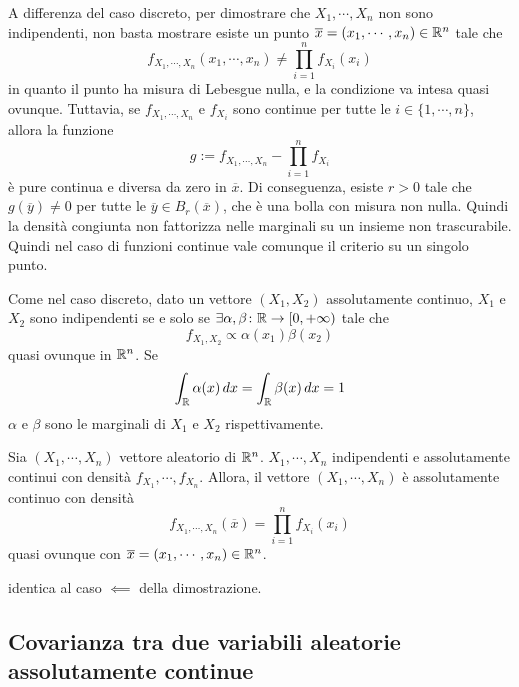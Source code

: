 \documentclass[a4paper]{article}
\begin{document}
A differenza del caso discreto, per dimostrare che \(X_1, \cdots, X_n\)
non sono indipendenti, non basta mostrare esiste un punto \(\overline x = (x_1, \cdots, x_n) \in \mathbb{R}^n\)
tale che \[
    f_{X_1, \cdots, X_n}(x_1, \cdots, x_n) \neq \prod_{i=1}^n f_{X_i}(x_i)
\]
in quanto il punto ha misura di Lebesgue nulla, e la condizione va intesa quasi ovunque.
Tuttavia, se \(f_{X_1, \cdots, X_n}\) e \(f_{X_i}\) sono continue per tutte le \(i \in \{1, \cdots, n\}\),
allora la funzione \[
    g := f_{X_1, \cdots, X_n} - \prod_{i=1}^n f_{X_i}
\]
è pure continua e diversa da zero in \(\overline x\).
Di conseguenza, esiste \(r > 0\) tale che \(g(\overline y) \neq 0\)
per tutte le \(\overline y \in B_r(\overline x)\), che è una bolla con misura non nulla.
Quindi la densità congiunta non fattorizza nelle marginali su un insieme non trascurabile.
Quindi nel caso di funzioni continue vale comunque il criterio su un singolo punto.

Come nel caso discreto, dato un vettore \((X_1, X_2)\) assolutamente continuo,
\(X_1\) e \(X_2\) sono indipendenti se e solo se \(\exists \alpha, \beta \colon \mathbb{R} \to [0,+\infty)\)
tale che \[
    f_{X_1, X_2} \propto \alpha(x_1)\beta(x_2)
\]
quasi ovunque in \(\mathbb{R}^n\). Se \[
    \int_{\mathbb{R}} \alpha(x)\,dx
    = \int_{\mathbb{R}} \beta(x)\,dx = 1
\]
\(\alpha\) e \(\beta\) sono le marginali di \(X_1\) e \(X_2\) rispettivamente.

\begin{snippetcorollary}{}
    Sia \((X_1, \cdots, X_n)\) vettore aleatorio di \(\mathbb{R}^n\).
    \(X_1, \cdots, X_n\) indipendenti e assolutamente continui con densità
    \(f_{X_1}, \cdots, f_{X_n}\). Allora, il vettore \((X_1, \cdots, X_n)\)
    è assolutamente continuo con densità
    \[
        f_{X_1, \cdots, X_n}(\overline x)
        = \prod_{i=1}^n f_{X_i}(x_i)
    \]
    quasi ovunque  con \(\overline x = (x_1, \cdots, x_n) \in \mathbb{R}^n\).
\end{snippetcorollary}

\begin{snippetproof}{}
    identica al caso \(\impliedby\) della dimostrazione.
\end{snippetproof}

\subsection{Covarianza tra due variabili aleatorie assolutamente continue}
\end{document}
